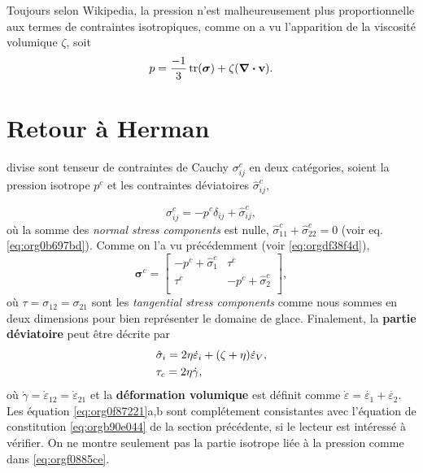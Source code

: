 \documentclass[10pt]{article}
\numberwithin{equation}{section}
\newcommand{\vv}{\vb{v}}
\begin{document}
Toujours selon Wikipedia, la pression n'est malheureusement plus proportionnelle aux termes de contraintes isotropiques, comme on a vu l'apparition de la viscosité volumique \(\zeta\), soit
\begin{equation}
   p = \frac{-1}{3} \trace(\boldsymbol{\sigma}) + \zeta\qty(\divergence{\vv}).
\end{equation}

\section{Retour à Herman}
\label{sec:orgd97596d}

\Textcite{herman2022granular} divise sont tenseur de contraintes de Cauchy \(\sigma_{ij}^c\) en deux catégories, soient la pression isotrope \(p^c\) et les contraintes déviatoires \(\hat{\sigma}^c_{ij}\),

\begin{equation}
   \sigma_{ij}^c = -p^c\delta_{ij} + \hat{\sigma}_{ij}^c,
\end{equation}
où la somme des \emph{normal stress components} est nulle, \(\hat{\sigma}^c_{11} + \hat{\sigma}^c_{22} = 0\) (voir eq. \ref{eq:org0b697bd}).
Comme on l'a vu précédemment (voir \ref{eq:orgdf38f4d}),
\begin{equation}
\label{eq:orgf0885ce}
   \boldsymbol{\sigma}^c = \begin{bmatrix}
     -p^c + \hat{\sigma}^c_1 & \tau^c \\
     \tau^c & -p^c + \hat{\sigma}^c_2 \\
   \end{bmatrix},
\end{equation}
où \(\tau = \sigma_{12} = \sigma_{21}\) sont les \emph{tangential stress components} comme nous sommes en deux dimensions pour bien représenter le domaine de glace.
Finalement, la \textbf{partie déviatoire} peut être décrite par
\begin{subequations}
\label{eq:org0f87221}
\begin{align}
   &\hat{\sigma}_i = 2\eta \dot{\varepsilon}_i + \qty(\zeta + \eta) \dot{\varepsilon}_V,\\
   &\tau_c = 2\eta\dot{\gamma},
\end{align}
\end{subequations}
où \(\dot{\gamma} = \dot{\varepsilon}_{12} = \dot{\varepsilon}_{21}\) et la \textbf{déformation volumique} est définit comme \(\dot{\varepsilon} = \dot{\varepsilon_1} + \dot{\varepsilon_2}\).
Les équation \ref{eq:org0f87221}a,b sont complétement consistantes avec l'équation de constitution \ref{eq:orgb90e044} de la section précédente, si le lecteur est intéressé à vérifier.
On ne montre seulement pas la partie isotrope liée à la pression comme dans \ref{eq:orgf0885ce}.\bigskip
\end{document}
